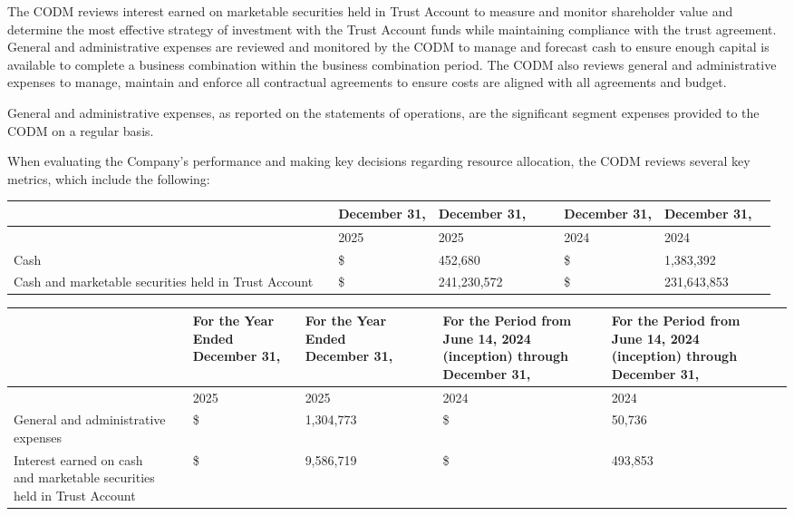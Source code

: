 \documentclass[11pt,a4paper]{article}
\begin{document}
The CODM reviews interest earned on marketable securities held in Trust Account to measure and monitor shareholder value and determine the most effective strategy of investment with the Trust Account funds while maintaining compliance with the trust agreement. General and administrative expenses are reviewed and monitored by the CODM to manage and forecast cash to ensure enough capital is available to complete a business combination within the business combination period. The CODM also reviews general and administrative expenses to manage, maintain and enforce all contractual agreements to ensure costs are aligned with all agreements and budget.

General and administrative expenses, as reported on the statements of operations, are the significant segment expenses provided to the CODM on a regular basis.

When evaluating the Company's performance and making key decisions regarding resource allocation, the CODM reviews several key metrics, which include the following:

\begin{table}[h]
\begin{tabular}{|l|l|l|l|l|l|l|l|l|}
\hline
 &  & December 31, & December 31, &  &  & December 31, & December 31, &  \\ \hline
 &  & 2025 & 2025 &  &  & 2024 & 2024 &  \\ \hline
Cash &  & \$ & 452,680 &  &  & \$ & 1,383,392 &  \\ \hline
Cash and marketable securities held in Trust Account &  & \$ & 241,230,572 &  &  & \$ & 231,643,853 &  \\ \hline
\end{tabular}
\end{table}

\begin{table}[h]
\begin{tabular}{|l|l|l|l|l|l|l|l|l|}
\hline
 &  & For the Year Ended December 31, & For the Year Ended December 31, &  &  & For the Period from June 14, 2024 (inception) through December 31, & For the Period from June 14, 2024 (inception) through December 31, &  \\ \hline
 &  & 2025 & 2025 &  &  & 2024 & 2024 &  \\ \hline
General and administrative expenses &  & \$ & 1,304,773 &  &  & \$ & 50,736 &  \\ \hline
Interest earned on cash and marketable securities held in Trust Account &  & \$ & 9,586,719 &  &  & \$ & 493,853 &  \\ \hline
\end{tabular}
\end{table}
\end{document}
